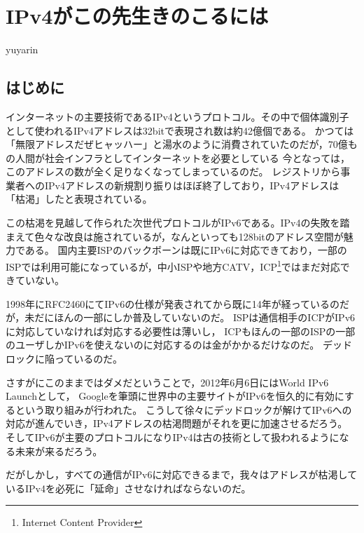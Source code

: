 

\chapter{IPv4がこの先生きのこるには}

\begin{flushright}
 yuyarin %
\end{flushright}

\section{はじめに}

\lettrine{イ}
ンターネットの主要技術であるIPv4というプロトコル。その中で個体識別子として使われるIPv4アドレスは32bitで表現され数は約42億個である。
かつては「無限アドレスだぜヒャッハー」と湯水のように消費されていたのだが，70億もの人間が社会インフラとしてインターネットを必要としている
今となっては，このアドレスの数が全く足りなくなってしまっているのだ。
レジストリから事業者へのIPv4アドレスの新規割り振りはほぼ終了しており，IPv4アドレスは「枯渇」したと表現されている。

この枯渇を見越して作られた次世代プロトコルがIPv6である。IPv4の失敗を踏まえて色々な改良は施されているが，なんといっても128bitのアドレス空間が魅力である。
国内主要ISPのバックボーンは既にIPv6に対応できており，一部のISPでは利用可能になっているが，中小ISPや地方CATV，ICP\footnote{Internet Content Provider}ではまだ対応できていない。

1998年にRFC2460にてIPv6の仕様が発表されてから既に14年が経っているのだが，未だにほんの一部にしか普及していないのだ。
ISPは通信相手のICPがIPv6に対応していなければ対応する必要性は薄いし，
ICPもほんの一部のISPの一部のユーザしかIPv6を使えないのに対応するのは金がかかるだけなのだ。
デッドロックに陥っているのだ。

さすがにこのままではダメだということで，2012年6月6日にはWorld IPv6 Launchとして，
Googleを筆頭に世界中の主要サイトがIPv6を恒久的に有効にするという取り組みが行われた。
こうして徐々にデッドロックが解けてIPv6への対応が進んでいき，IPv4アドレスの枯渇問題がそれを更に加速させるだろう。
そしてIPv6が主要のプロトコルになりIPv4は古の技術として扱われるようになる未来が来るだろう。

だがしかし，すべての通信がIPv6に対応できるまで，我々はアドレスが枯渇しているIPv4を必死に「延命」させなければならないのだ。

